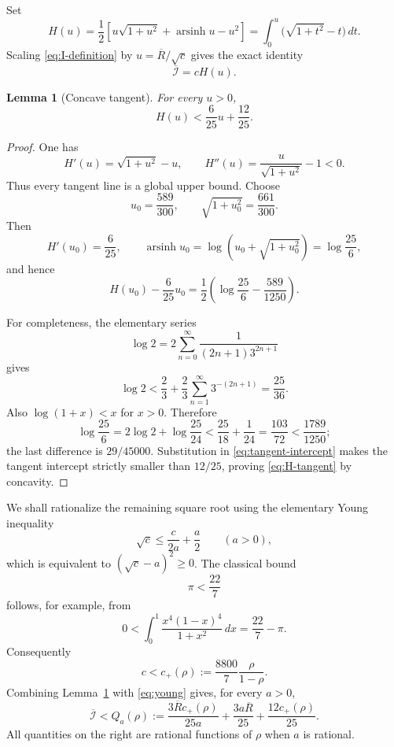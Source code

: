 \documentclass[11pt]{article}
\newtheorem{lemma}[theorem]{Lemma}
\newcommand{\Ibar}{\overline{\mathcal I}}
\newcommand{\Rbar}{\overline R}
\begin{document}
Set
\[
 H(u)=\frac12\left[
 u\sqrt{1+u^2}+\operatorname{arsinh}u-u^2
 \right]
 =\int_0^u\bigl(\sqrt{1+t^2}-t\bigr)\,dt.
\]
Scaling \eqref{eq:I-definition} by
\(u=\Rbar/\sqrt c\) gives the exact identity
\begin{equation}
       \Ibar=cH(u).
       \label{eq:I-scaled}
\end{equation}

\begin{lemma}[Concave tangent]
\label{lem:H-tangent}
For every \(u>0\),
\begin{equation}
       H(u)<\frac6{25}u+\frac{12}{25}.
       \label{eq:H-tangent}
\end{equation}
\end{lemma}

\begin{proof}
One has
\[
 H'(u)=\sqrt{1+u^2}-u,
 \qquad
 H''(u)=\frac{u}{\sqrt{1+u^2}}-1<0.
\]
Thus every tangent line is a global upper bound.  Choose
\[
 u_0=\frac{589}{300},
 \qquad
 \sqrt{1+u_0^2}=\frac{661}{300}.
\]
Then
\[
 H'(u_0)=\frac6{25},
 \qquad
 \operatorname{arsinh}u_0
 =\log\left(u_0+\sqrt{1+u_0^2}\right)
 =\log\frac{25}{6},
\]
and hence
\begin{equation}
 H(u_0)-\frac6{25}u_0
 =\frac12\left(\log\frac{25}{6}-\frac{589}{1250}\right).
 \label{eq:tangent-intercept}
\end{equation}

For completeness, the elementary series
\[
 \log2=2\sum_{n=0}^{\infty}
       \frac{1}{(2n+1)3^{2n+1}}
\]
gives
\[
 \log2
 <\frac23+\frac23\sum_{n=1}^{\infty}3^{-(2n+1)}
 =\frac{25}{36}.
\]
Also \(\log(1+x)<x\) for \(x>0\).  Therefore
\[
 \log\frac{25}{6}
 =2\log2+\log\frac{25}{24}
 <\frac{25}{18}+\frac1{24}
 =\frac{103}{72}
 <\frac{1789}{1250};
\]
the last difference is \(29/45000\).  Substitution in
\eqref{eq:tangent-intercept} makes the tangent intercept strictly smaller
than \(12/25\), proving \eqref{eq:H-tangent} by concavity.
\end{proof}

We shall rationalize the remaining square root using the elementary Young
inequality
\begin{equation}
       \sqrt c\leq\frac{c}{2a}+\frac a2
       \qquad(a>0),
       \label{eq:young}
\end{equation}
which is equivalent to \((\sqrt c-a)^2\geq0\).  The classical bound
\begin{equation}
       \pi<\frac{22}{7}
       \label{eq:pi-upper}
\end{equation}
follows, for example, from
\[
 0<\int_0^1\frac{x^4(1-x)^4}{1+x^2}\,dx=\frac{22}{7}-\pi.
\]
Consequently
\[
       c<c_+(\rho):=\frac{8800}{7}\frac{\rho}{1-\rho}.
\]
Combining Lemma~\ref{lem:H-tangent} with \eqref{eq:young} gives, for every
\(a>0\),
\begin{equation}
 \Ibar<Q_a(\rho):=
 \frac{3\Rbar c_+(\rho)}{25a}
 +\frac{3a\Rbar}{25}
 +\frac{12c_+(\rho)}{25}.
 \label{eq:Qa}
\end{equation}
All quantities on the right are rational functions of \(\rho\) when
\(a\) is rational.
\end{document}
